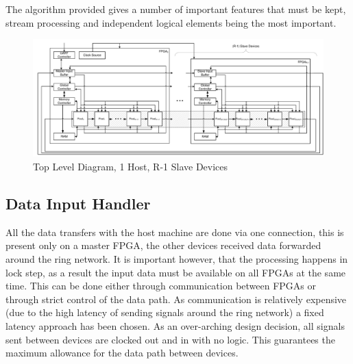 The algorithm provided gives a number of important features that must be kept, stream processing and independent logical elements being the most important. 
\begin{figure}
  \centering
  \includegraphics[width=\textheight]{./figs/MFPGA.pdf}
  \caption{Top Level Diagram, 1 Host, R-1 Slave Devices}
  \label{fig:tld}
\end{figure}


\subsection{Data Input Handler}
All the data transfers with the host machine are done via one connection, this is present only on a master FPGA, the other devices received data forwarded around the ring network. It is important however, that the processing happens in lock step, as a result the input data must be available on all FPGAs at the same time. This can be done either through communication between FPGAs or through strict control of the data path. As communication is relatively expensive (due to the high latency of sending signals around the ring network) a fixed latency approach has been chosen. As an over-arching design decision, all signals sent between devices are clocked out and in with no logic. This guarantees the maximum allowance for the data path between devices. 

